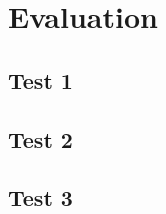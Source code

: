 \section{Evaluation}\label{sec:Evaluation}
\subsection{Test 1}
\subsection{Test 2}
\subsection{Test 3}